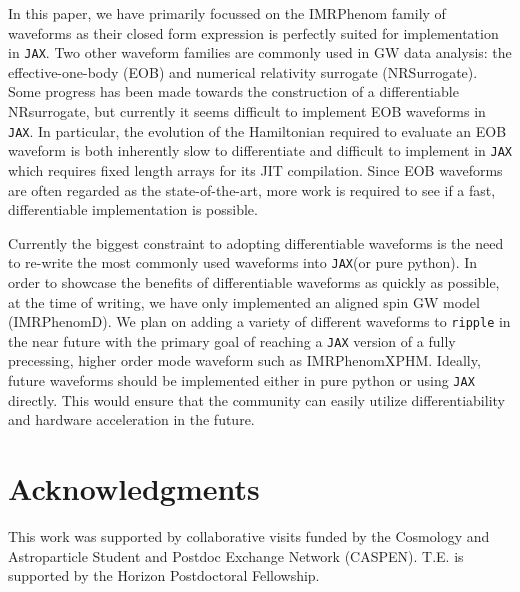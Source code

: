 \documentclass[twocolumn]{aastex631}
\newcommand{\jax}{\texttt{JAX}\xspace}
\newcommand{\ripple}{\texttt{ripple}\xspace}
\begin{document}
In this paper, we have primarily focussed on the IMRPhenom family of waveforms as their closed form expression is perfectly suited for implementation in \jax.
Two other waveform families are commonly used in GW data analysis: the effective-one-body (EOB) and numerical relativity surrogate (NRSurrogate). 
Some progress has been made towards the construction of a differentiable NRsurrogate, but currently it seems difficult to implement EOB waveforms in \jax.
In particular, the evolution of the Hamiltonian required to evaluate an EOB waveform is both inherently slow to differentiate and difficult to implement in \jax which requires fixed length arrays for its JIT compilation.
Since EOB waveforms are often regarded as the state-of-the-art, more work is required to see if a fast, differentiable implementation is possible.

Currently the biggest constraint to adopting differentiable waveforms is the need to re-write the most commonly used waveforms into \jax (or pure python).
In order to showcase the benefits of differentiable waveforms as quickly as possible, at the time of writing, we have only implemented an aligned spin GW model (IMRPhenomD).
We plan on adding a variety of different waveforms to \ripple in the near future with the primary goal of reaching a \jax version of a fully precessing, higher order mode waveform such as IMRPhenomXPHM.
Ideally, future waveforms should be implemented either in pure python or using \jax directly.
This would ensure that the community can easily utilize differentiability and hardware acceleration in the future.


\section{Acknowledgments}
This work was supported by collaborative visits funded by the Cosmology and Astroparticle Student and Postdoc Exchange Network (CASPEN). 
T.E. is supported by the Horizon Postdoctoral Fellowship.


\end{document}
